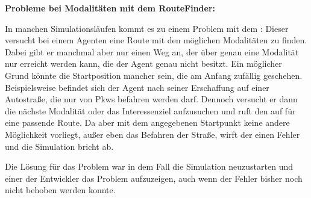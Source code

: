 \textbf{Probleme bei Modalitäten mit dem RouteFinder:}

In manchen Simulationsläufen kommt es zu einem Problem mit dem : Dieser versucht bei einem Agenten eine Route mit den möglichen Modalitäten zu finden.
Dabei gibt er manchmal aber nur einen Weg an, der über genau eine Modalität nur erreicht werden kann, die der Agent genau nicht besitzt.
Ein möglicher Grund könnte die Startposition mancher  sein, die am Anfang zufällig geschehen.
Beispielsweise befindet sich der Agent nach seiner Erschaffung auf einer Autostraße, die nur von Pkws befahren werden darf.
Dennoch versucht er dann die nächste Modalität oder das Interessenziel aufzusuchen und ruft den  auf für eine passende Route.
Da aber mit dem angegebenen Startpunkt keine andere Möglichkeit vorliegt, außer eben das Befahren der Straße, wirft der  einen Fehler und die Simulation bricht ab.

Die Lösung für das Problem war in dem Fall die Simulation neuzustarten und einer der Entwickler das Problem aufzuzeigen, auch wenn der Fehler bisher noch nicht behoben werden konnte.
